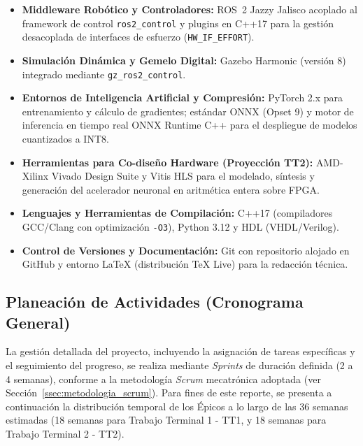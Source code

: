 \documentclass[12pt]{article}
\begin{document}
\begin{itemize}
\begin{itemize}
            \item \textbf{Middleware Robótico y Controladores:} ROS~2 Jazzy Jalisco acoplado al framework de control \texttt{ros2\_control} y plugins en C++17 para la gestión desacoplada de interfaces de esfuerzo (\texttt{HW\_IF\_EFFORT}).
            \item \textbf{Simulación Dinámica y Gemelo Digital:} Gazebo Harmonic (versión 8) integrado mediante \texttt{gz\_ros2\_control}.
            \item \textbf{Entornos de Inteligencia Artificial y Compresión:} PyTorch 2.x para entrenamiento y cálculo de gradientes; estándar ONNX (Opset 9) y motor de inferencia en tiempo real ONNX Runtime C++ para el despliegue de modelos cuantizados a INT8.
            \item \textbf{Herramientas para Co-diseño Hardware (Proyección TT2):} AMD-Xilinx Vivado Design Suite y Vitis HLS para el modelado, síntesis y generación del acelerador neuronal en aritmética entera sobre FPGA.
            \item \textbf{Lenguajes y Herramientas de Compilación:} C++17 (compiladores GCC/Clang con optimización \texttt{-O3}), Python 3.12 y HDL (VHDL/Verilog).
            \item \textbf{Control de Versiones y Documentación:} Git con repositorio alojado en GitHub y entorno LaTeX (distribución TeX Live) para la redacción técnica.
        \end{itemize}
\end{itemize}

\subsection*{Planeación de Actividades (Cronograma General)}
\label{ssec:planeacion_actividades_listas}

La gestión detallada del proyecto, incluyendo la asignación de tareas específicas y el seguimiento del progreso, se realiza mediante \textit{Sprints} de duración definida (2 a 4 semanas), conforme a la metodología \textit{Scrum} mecatrónica adoptada (ver Sección~\ref{ssec:metodologia_scrum}). Para fines de este reporte, se presenta a continuación la distribución temporal de los Épicos a lo largo de las 36 semanas estimadas (18 semanas para Trabajo Terminal 1 - TT1, y 18 semanas para Trabajo Terminal 2 - TT2).
\end{document}
